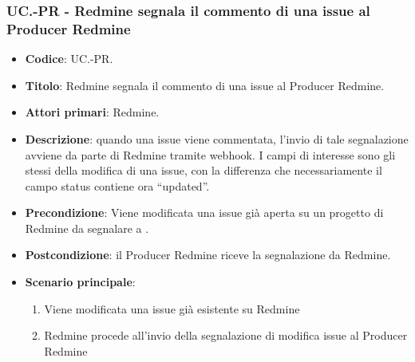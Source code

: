 \subsubsection{UC\theuccount.\thesubuccount-PR - Redmine segnala il commento di una issue al Producer Redmine}
\begin{itemize}
	\item \textbf{Codice}: UC\theuccount.\thesubuccount-PR.
	\item \textbf{Titolo}: Redmine segnala il commento di una issue al Producer Redmine.
	\item \textbf{Attori primari}: Redmine.
	\item \textbf{Descrizione}: quando una issue viene commentata, l'invio di tale segnalazione
	avviene da parte di Redmine tramite webhook.
	I campi di interesse sono gli stessi della modifica di una issue, con la differenza che necessariamente il campo status contiene ora ``updated''.
	\item \textbf{Precondizione}: Viene modificata una issue già aperta su un
	progetto di Redmine da segnalare a \progetto.
	\item \textbf{Postcondizione}: il Producer Redmine riceve la segnalazione da Redmine.
	\item \textbf{Scenario principale}: 
	\begin{enumerate}
		\item Viene modificata una issue già esistente su Redmine
		\item Redmine procede all'invio della segnalazione di modifica issue al Producer Redmine
	\end{enumerate}
	
\end{itemize}
